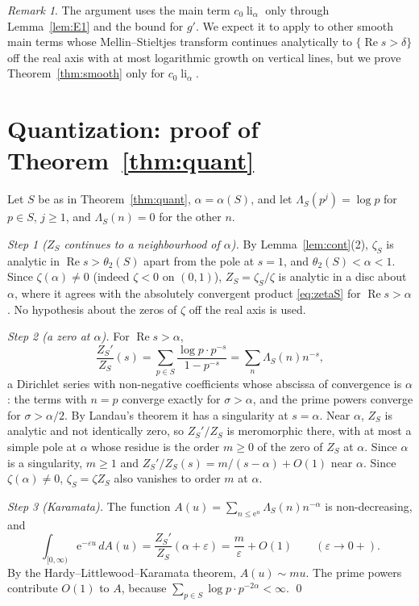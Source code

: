 \documentclass[11pt]{amsart}
\theoremstyle{remark}
\newtheorem{remark}[lemma]{Remark}
\numberwithin{equation}{section}
\newcommand{\eps}{\varepsilon}
\newcommand{\e}{\mathrm{e}}
\DeclareMathOperator{\re}{Re}
\DeclareMathOperator{\li}{li}
\begin{document}
\begin{remark}
The argument uses the main term $c_0\li_\alpha$ only through Lemma~\ref{lem:E1} and the bound for $g'$. We expect it to apply to other smooth main terms whose Mellin--Stieltjes transform continues analytically to $\{\re s>\delta\}$ off the real axis with at most logarithmic growth on vertical lines, but we prove Theorem~\ref{thm:smooth} only for $c_0\li_\alpha$.
\end{remark}

\section{Quantization: proof of Theorem~\ref{thm:quant}}\label{sec:quant}

Let $S$ be as in Theorem~\ref{thm:quant}, $\alpha=\alpha(S)$, and let $\Lambda_S(p^j)=\log p$ for $p\in S$, $j\ge1$, and $\Lambda_S(n)=0$ for the other $n$.

\emph{Step 1 ($Z_S$ continues to a neighbourhood of $\alpha$).} By Lemma~\ref{lem:cont}(2), $\zeta_S$ is analytic in $\re s>\theta_2(S)$ apart from the pole at $s=1$, and $\theta_2(S)<\alpha<1$. Since $\zeta(\alpha)\ne0$ (indeed $\zeta<0$ on $(0,1)$), $Z_S=\zeta_S/\zeta$ is analytic in a disc about $\alpha$, where it agrees with the absolutely convergent product \eqref{eq:zetaS} for $\re s>\alpha$. No hypothesis about the zeros of $\zeta$ off the real axis is used.

\emph{Step 2 (a zero at $\alpha$).} For $\re s>\alpha$,
\[
\frac{Z_S'}{Z_S}(s)=\sum_{p\in S}\frac{\log p\cdot p^{-s}}{1-p^{-s}}=\sum_n\Lambda_S(n)n^{-s},
\]
a Dirichlet series with non-negative coefficients whose abscissa of convergence is $\alpha$: the terms with $n=p$ converge exactly for $\sigma>\alpha$, and the prime powers converge for $\sigma>\alpha/2$. By Landau's theorem it has a singularity at $s=\alpha$. Near $\alpha$, $Z_S$ is analytic and not identically zero, so $Z_S'/Z_S$ is meromorphic there, with at most a simple pole at $\alpha$ whose residue is the order $m\ge0$ of the zero of $Z_S$ at $\alpha$. Since $\alpha$ is a singularity, $m\ge1$ and $Z_S'/Z_S(s)=m/(s-\alpha)+O(1)$ near $\alpha$. Since $\zeta(\alpha)\ne0$, $\zeta_S=\zeta Z_S$ also vanishes to order $m$ at $\alpha$.

\emph{Step 3 (Karamata).} The function $A(u)=\sum_{n\le\e^u}\Lambda_S(n)n^{-\alpha}$ is non-decreasing, and
\[
\int_{[0,\infty)}\e^{-\eps u}\,dA(u)=\frac{Z_S'}{Z_S}(\alpha+\eps)=\frac m\eps+O(1)\qquad(\eps\to0+).
\] By the Hardy--Littlewood--Karamata theorem, $A(u)\sim mu$. The prime powers contribute $O(1)$ to $A$, because $\sum_{p\in S}\log p\cdot p^{-2\alpha}<\infty$. \qed
\end{document}
